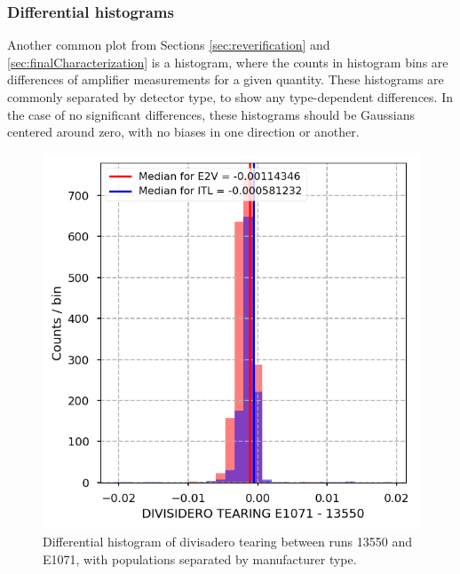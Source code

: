 \clearpage
\subsubsection{Differential histograms}

Another common plot from Sections \ref{sec:reverification} and \ref{sec:finalCharacterization} is a histogram, where the counts in histogram bins are differences of amplifier measurements for a given quantity. These histograms are commonly separated by detector type, to show any type-dependent differences. In the case of no significant differences, these histograms should be Gaussians centered around zero, with no biases in one direction or another. %

\begin{figure}
    \centering
    \includegraphics[width=0.8\linewidth]{figures/baselineCharacterization/DIVISIDERO_TEARING_13550_E1071_diff.png}
    \caption{Differential histogram of divisadero tearing between runs 13550 and E1071, with populations separated by manufacturer type.}
    \label{fig:ref:histDiff}
\end{figure}

\clearpage

